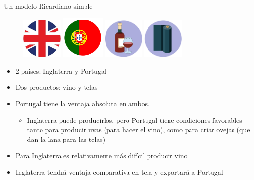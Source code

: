 \documentclass{beamer}
\begin{document}
\begin{frame}{Un modelo Ricardiano simple}
    \begin{figure}
        \centering
        \includegraphics[width=0.18\textwidth]{../Figures/M7.1.jpg}
        \includegraphics[width=0.19\textwidth]{../Figures/M7.2.jpg}
        \hspace{15mm}
        \includegraphics[width=0.18\textwidth]{../Figures/M7.3.jpg}
        \includegraphics[width=0.18\textwidth]{../Figures/M7.4.jpg}
    \end{figure}

    \begin{itemize}
        \item 2 países: Inglaterra y Portugal\vspace{1.5mm}
        \item Dos productos: vino y telas\vspace{1.5mm}
        \item Portugal tiene la ventaja absoluta en ambos. 
            \begin{itemize}
            \item Inglaterra puede producirlos, pero Portugal tiene condiciones favorables tanto para producir uvas (para hacer el vino), como para criar ovejas (que dan la lana para las telas)\vspace{1.5mm}
            \end{itemize} 
        \item Para Inglaterra es relativamente más difícil producir vino\vspace{1.5mm}
        \item Inglaterra tendrá ventaja comparativa en tela y exportará a Portugal
    \end{itemize} 
\end{frame}
\end{document}
